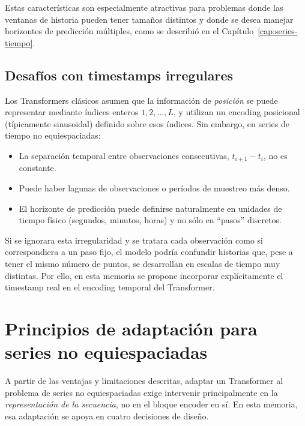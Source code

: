 Estas características son especialmente atractivas para problemas donde las ventanas de historia pueden tener tamaños distintos y donde se desea manejar horizontes de predicción múltiples, como se describió en el Capítulo~\ref{cap:series-tiempo}.

\subsection{Desafíos con timestamps irregulares}

Los Transformers clásicos asumen que la información de \emph{posición} se puede representar mediante índices enteros $1,2,\dots,L$, y utilizan un encoding posicional (típicamente sinusoidal) definido sobre esos índices. Sin embargo, en series de tiempo no equiespaciadas:
\begin{itemize}
    \item La separación temporal entre observaciones consecutivas, $t_{i+1} - t_i$, no es constante.
    \item Puede haber lagunas de observaciones o períodos de muestreo más denso.
    \item El horizonte de predicción puede definirse naturalmente en unidades de tiempo físico (segundos, minutos, horas) y no sólo en ``pasos'' discretos.
\end{itemize}

Si se ignorara esta irregularidad y se tratara cada observación como si correspondiera a un paso fijo, el modelo podría confundir historias que, pese a tener el mismo número de puntos, se desarrollan en escalas de tiempo muy distintas. Por ello, en esta memoria se propone incorporar explícitamente el timestamp real en el encoding temporal del Transformer.

\section{Principios de adaptación para series no equiespaciadas}
\label{sec:modelo-propuesto}

A partir de las ventajas y limitaciones descritas, adaptar un Transformer al problema de series no equiespaciadas exige intervenir principalmente en la \textit{representación de la secuencia}, no en el bloque encoder en sí. En esta memoria, esa adaptación se apoya en cuatro decisiones de diseño.

